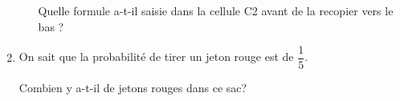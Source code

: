 \begin{enumerate}
\begin{enumerate}
Quelle formule a-t-il saisie dans la cellule C2 avant de la recopier vers le bas ?
\end{enumerate}
\item On sait que la probabilité de tirer un jeton rouge est de $\dfrac{1}{5}$.  

Combien y a-t-il de jetons rouges dans ce sac? 
\end{enumerate}

\vspace{0,5cm} 

